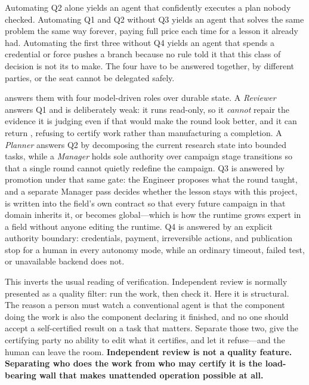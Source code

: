 Automating Q2 alone yields an agent that confidently executes a plan nobody checked.
Automating Q1 and Q2 without Q3 yields an agent that solves the same problem the same
way forever, paying full price each time for a lesson it already had. Automating the
first three without Q4 yields an agent that spends a credential or force pushes a
branch because no rule told it that this class of decision is not its to make. The
four have to be answered together, by different parties, or the seat cannot be
delegated safely.

\systemname answers them with four model-driven roles over durable state. A
\emph{Reviewer} answers Q1 and is deliberately weak: it runs read-only, so it
\emph{cannot} repair the evidence it is judging even if that would make the round
look better, and it can return , refusing to certify work rather than
manufacturing a completion. A \emph{Planner} answers Q2 by decomposing the current
research state into bounded tasks, while a \emph{Manager} holds sole authority over
campaign stage transitions so that a single round cannot quietly redefine the
campaign. Q3 is answered by promotion under that same gate: the Engineer proposes
what the round taught, and a separate Manager pass decides whether the lesson stays
with this project, is written into the field's own contract so that every future
campaign in that domain inherits it, or becomes global---which is how the runtime
grows expert in a field without anyone editing the runtime. Q4 is answered by an
explicit authority boundary: credentials, payment,
irreversible actions, and publication stop for a human in every autonomy mode, while
an ordinary timeout, failed test, or unavailable backend does not.

This inverts the usual reading of verification. Independent review is normally
presented as a quality filter: run the work, then check it. Here it is structural.
The reason a person must watch a conventional agent is that the component doing the
work is also the component declaring it finished, and no one should accept a
self-certified result on a task that matters. Separate those two, give the certifying
party no ability to edit what it certifies, and let it refuse---and the human can
leave the room. \textbf{Independent review is not a quality feature. Separating who
does the work from who may certify it is the load-bearing wall that makes unattended
operation possible at all.}

